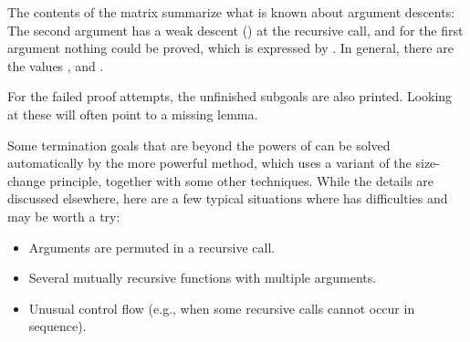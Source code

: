\begin{isabellebody}
\begin{isamarkuptext}
  The contents of the matrix summarize what is known about argument
  descents: The second argument has a weak descent (\isa{{\isacharless}{\isacharequal}}) at the
  recursive call, and for the first argument nothing could be proved,
  which is expressed by \isa{{\isacharquery}}. In general, there are the values
  \isa{{\isacharless}}, \isa{{\isacharless}{\isacharequal}} and \isa{{\isacharquery}}.

  For the failed proof attempts, the unfinished subgoals are also
  printed. Looking at these will often point to a missing lemma.%
\end{isamarkuptext}%
\isamarkuptrue%
%
\isamarkuptrue%
%
\begin{isamarkuptext}%
Some termination goals that are beyond the powers of
   can be solved automatically by the
  more powerful  method, which uses a variant of
  the size-change principle, together with some other
  techniques. While the details are discussed
  elsewhere\cite{krauss_phd},
  here are a few typical situations where
   has difficulties and 
  may be worth a try:
  \begin{itemize}
  \item Arguments are permuted in a recursive call.
  \item Several mutually recursive functions with multiple arguments.
  \item Unusual control flow (e.g., when some recursive calls cannot
  occur in sequence).
  \end{itemize}


\end{isamarkuptext}
\end{isabellebody}
